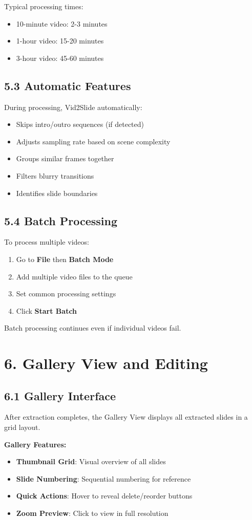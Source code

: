 \documentclass[12pt,a4paper]{article}
\newcommand{\sectionTitle}[1]{\section*{#1}}
\newcommand{\subsectionTitle}[1]{\subsection*{#1}}
\begin{document}
Typical processing times:
\begin{itemize}
    \item 10-minute video: 2-3 minutes
    \item 1-hour video: 15-20 minutes
    \item 3-hour video: 45-60 minutes
\end{itemize}

\subsectionTitle{5.3 Automatic Features}

During processing, Vid2Slide automatically:
\begin{itemize}
    \item Skips intro/outro sequences (if detected)
    \item Adjusts sampling rate based on scene complexity
    \item Groups similar frames together
    \item Filters blurry transitions
    \item Identifies slide boundaries
\end{itemize}

\subsectionTitle{5.4 Batch Processing}

To process multiple videos:
\begin{enumerate}
    \item Go to \textbf{File} then \textbf{Batch Mode}
    \item Add multiple video files to the queue
    \item Set common processing settings
    \item Click \textbf{Start Batch}
\end{enumerate}

Batch processing continues even if individual videos fail.

\newpage

\sectionTitle{6. Gallery View and Editing}

\subsectionTitle{6.1 Gallery Interface}

After extraction completes, the Gallery View displays all extracted slides in a grid layout.

\textbf{Gallery Features:}
\begin{itemize}
    \item \textbf{Thumbnail Grid}: Visual overview of all slides
    \item \textbf{Slide Numbering}: Sequential numbering for reference
    \item \textbf{Quick Actions}: Hover to reveal delete/reorder buttons
    \item \textbf{Zoom Preview}: Click to view in full resolution
\end{itemize}
\end{document}
